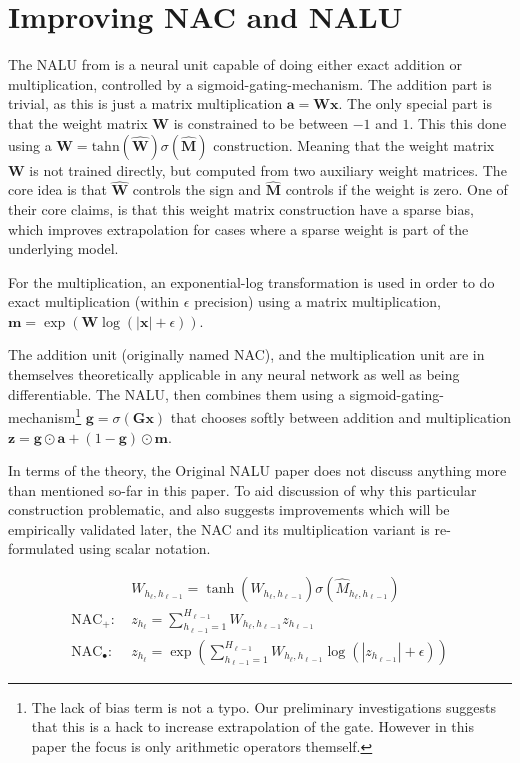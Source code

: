 \section{Improving NAC and NALU}

The NALU from \cite{trask-nalu} is a neural unit capable of doing either exact addition or multiplication, controlled by a sigmoid-gating-mechanism. The addition part is trivial, as this is just a matrix multiplication $\mathbf{a} = \mathbf{W}\mathbf{x}$. The only special part is that the weight matrix $\mathbf{W}$ is constrained to be between $-1$ and $1$. This this done using a $\mathbf{W} = \mathrm{tahn}({\hat{\mathbf{W}}}) \sigma({\hat{\mathbf{M}}})$ construction. Meaning that the weight matrix $\mathbf{W}$ is not trained directly, but computed from two auxiliary weight matrices. The core idea is that $\hat{\mathbf{W}}$ controls the sign and $\hat{\mathbf{M}}$ controls if the weight is zero. One of their core claims, is that this weight matrix construction have a sparse bias, which improves extrapolation for cases where a sparse weight is part of the underlying model.

For the multiplication, an exponential-log transformation is used in order to do exact multiplication (within $\epsilon$ precision) using a matrix multiplication, $\mathbf{m} = \exp(\mathbf{W} \log(|\mathbf{x}| + \epsilon))$.

The addition unit (originally named NAC), and the multiplication unit are in themselves theoretically applicable in any neural network as well as being differentiable. The NALU, then combines them using a sigmoid-gating-mechanism\footnote{The lack of bias term is not a typo. Our preliminary investigations suggests that this is a hack to increase extrapolation of the gate. However in this paper the focus is only arithmetic operators themself.} $\mathbf{g} = \sigma(\mathbf{G} \mathbf{x})$ that chooses softly between addition and multiplication $\mathbf{z} = \mathbf{g} \odot \mathbf{a} + (1 - \mathbf{g}) \odot \mathbf{m}$.

In terms of the theory, the Original NALU paper \cite{trask-nalu} does not discuss anything more than mentioned so-far in this paper. To aid discussion of why this particular construction problematic, and also suggests improvements which will be empirically validated later, the NAC and its multiplication variant is re-formulated using scalar notation.

\begin{equation}
\begin{aligned}
&W_{h_\ell, h_{\ell-1}} = \tanh(\hat{W}_{h_\ell, h_{\ell-1}}) \sigma(\hat{M}_{h_\ell, h_{\ell-1}}) \\
\textrm{NAC}_+:\ &z_{h_\ell} = \sum_{h_{\ell-1}=1}^{H_{\ell-1}} W_{h_{\ell}, h_{\ell-1}} z_{h_{\ell-1}} \\
\textrm{NAC}_\bullet:\ &z_{h_\ell} = \exp\left(\sum_{h_{\ell-1}=1}^{H_{\ell-1}} W_{h_{\ell}, h_{\ell-1}} \log(|z_{h_{\ell-1}}| + \epsilon) \right)
\end{aligned}
\end{equation}

